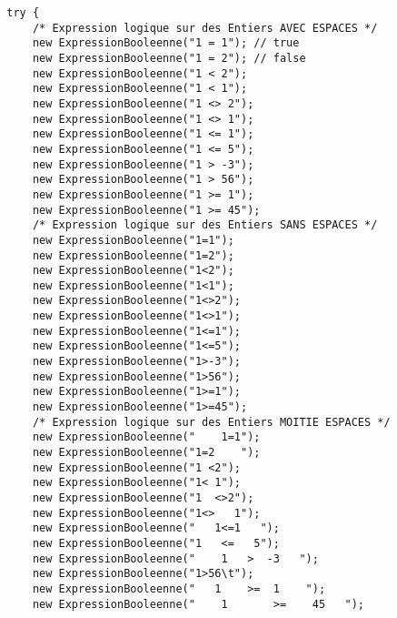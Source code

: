 \begin{enum}
\begin{verbatim}
        try {
            /* Expression logique sur des Entiers AVEC ESPACES */
            new ExpressionBooleenne("1 = 1"); // true
            new ExpressionBooleenne("1 = 2"); // false
            new ExpressionBooleenne("1 < 2");
            new ExpressionBooleenne("1 < 1");
            new ExpressionBooleenne("1 <> 2");
            new ExpressionBooleenne("1 <> 1");
            new ExpressionBooleenne("1 <= 1");
            new ExpressionBooleenne("1 <= 5");
            new ExpressionBooleenne("1 > -3");
            new ExpressionBooleenne("1 > 56");
            new ExpressionBooleenne("1 >= 1");
            new ExpressionBooleenne("1 >= 45");
            /* Expression logique sur des Entiers SANS ESPACES */
            new ExpressionBooleenne("1=1");
            new ExpressionBooleenne("1=2");
            new ExpressionBooleenne("1<2");
            new ExpressionBooleenne("1<1");
            new ExpressionBooleenne("1<>2");
            new ExpressionBooleenne("1<>1");
            new ExpressionBooleenne("1<=1");
            new ExpressionBooleenne("1<=5");
            new ExpressionBooleenne("1>-3");
            new ExpressionBooleenne("1>56");
            new ExpressionBooleenne("1>=1");
            new ExpressionBooleenne("1>=45");
            /* Expression logique sur des Entiers MOITIE ESPACES */
            new ExpressionBooleenne("    1=1");
            new ExpressionBooleenne("1=2    ");
            new ExpressionBooleenne("1 <2");
            new ExpressionBooleenne("1< 1");
            new ExpressionBooleenne("1  <>2");
            new ExpressionBooleenne("1<>   1");
            new ExpressionBooleenne("   1<=1   ");
            new ExpressionBooleenne("1   <=   5");
            new ExpressionBooleenne("    1   >  -3   ");
            new ExpressionBooleenne("1>56\t");
            new ExpressionBooleenne("   1    >=  1    ");
            new ExpressionBooleenne("    1       >=    45   ");
            

\end{verbatim}
\end{enum}
